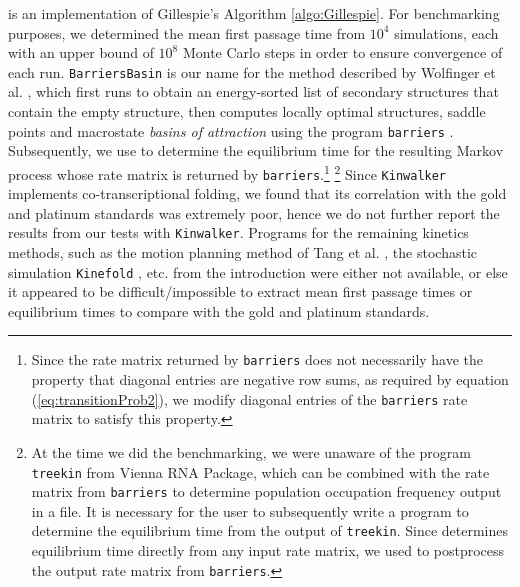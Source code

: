 \kinfold \citep{flamm} is an implementation of Gillespie's
Algorithm \ref{algo:Gillespie}.
For benchmarking purposes, we determined the mean first passage time
from $10^4$ \kinfold simulations, each with an upper bound of
$10^8$ Monte Carlo steps in order to ensure convergence of each run.
{\tt BarriersBasin} is our name for the method described by Wolfinger
et al. \citep{wolfingerStadler:kinetics}, which first runs
\rnasub \citep{flammHofacker} to obtain an energy-sorted list of
secondary structures that contain the empty structure,
then computes locally optimal structures, saddle points and macrostate
{\em basins of attraction}  using the program {\tt barriers}
\citep{wolfingerStadler:kinetics}. Subsequently, we use \hermes to
determine the equilibrium time for the resulting Markov process whose
rate matrix is returned by {\tt barriers}.\footnote{Since
the rate matrix returned by {\tt barriers}
does not necessarily have the property that diagonal entries are negative
row sums, as required by equation (\ref{eq:transitionProb2}), we modify
diagonal entries of the {\tt barriers} rate matrix to satisfy this property.}
\footnote{At the time we did the benchmarking, we were unaware of the
program {\tt treekin} from Vienna RNA Package, which can be combined with
the rate matrix from {\tt barriers} to determine population occupation
frequency output in a file. It is necessary for the user to subsequently
write a program to determine the equilibrium time from the output of
{\tt treekin}. Since \hermes determines equilibrium time directly
from any input rate matrix, we used \hermes to postprocess the
output rate matrix from {\tt barriers}.}
Since {\tt Kinwalker} \citep{Geis.jmb08} implements co-transcriptional folding,
we found that its correlation with the gold and platinum standards was
extremely poor, hence we do not further report the results from our tests
with {\tt Kinwalker}.
Programs for the remaining kinetics methods, such as the motion planning
method of Tang et al. \citep{Tang.jmb08}, the stochastic simulation
{\tt Kinefold} \citep{Xayaphoummine.nar05}, etc.
from the introduction were either not available, or else it
appeared to be difficult/impossible to extract
mean first passage times or equilibrium times to compare with the
gold and platinum standards.


